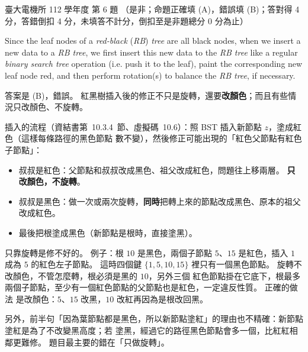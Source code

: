 \begin{pastexam}[label={px:ntu-112-ee-ds-06}]{臺大電機所 112 學年度 第 6 題}
（是非；命題正確填 (A)，錯誤填 (B)；答對得 4 分，答錯倒扣 4 分，未填答不計分，倒扣至是非題總分 0 分為止）

Since the leaf nodes of a \textit{red-black} (\textit{RB}) \textit{tree} are all black nodes, when we insert a new data to a \textit{RB tree}, we first insert this new data to the \textit{RB tree} like a regular \textit{binary search tree} operation (i.e. push it to the leaf), paint the corresponding new leaf node red, and then perform rotation(s) to balance the \textit{RB tree}, if necessary.
\end{pastexam}

\begin{pastsoln}
答案是 (B)，錯誤。 紅黑樹插入後的修正不只是旋轉，還要\textbf{改顏色}；而且有些情況只改顏色、不旋轉。

插入的流程（資結書第~10.3.4~節、虛擬碼~10.6）：照 BST 插入新節點 $z$，塗成紅色（這樣每條路徑的黑色節點
數不變），然後修正可能出現的「紅色父節點有紅色子節點」：
\begin{itemize}
\item 叔叔是紅色：父節點和叔叔改成黑色、祖父改成紅色，問題往上移兩層。 \textbf{只改顏色，不旋轉}。
\item 叔叔是黑色：做一次或兩次旋轉，\textbf{同時}把轉上來的節點改成黑色、原本的祖父改成紅色。
\item 最後把根塗成黑色（新節點是根時，直接塗黑）。
\end{itemize}

只靠旋轉是修不好的。 例子：根 $10$ 是黑色，兩個子節點 $5$、$15$ 是紅色，插入 $1$ 成為 $5$ 的紅色左子節點。
這時四個鍵 $\{1, 5, 10, 15\}$ 裡只有一個黑色節點。 旋轉不改顏色，不管怎麼轉，根必須是黑的 $10$，另外三個
紅色節點掛在它底下，根最多兩個子節點，至少有一個紅色節點的父節點也是紅色，一定違反性質。 正確的做法
是改顏色：$5$、$15$ 改黑，$10$ 改紅再因為是根改回黑。

另外，前半句「因為葉節點都是黑色，所以新節點塗紅」的理由也不精確：新節點塗紅是為了不改變黑高度；若
塗黑，經過它的路徑黑色節點會多一個，比紅紅相鄰更難修。 題目最主要的錯在「只做旋轉」。
\end{pastsoln}

